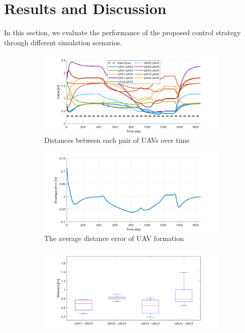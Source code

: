 \section{Results and Discussion} \label{sec:0result}
In this section, we evaluate the performance of the proposed control strategy through different simulation scenarios.

\begin{figure}[t]
    \centering
    \begin{subfigure}[b]{0.49\textwidth}
    \includegraphics[width=\textwidth]{paper1/images/distance.png}
    \caption{Distances between each pair of UAVs over time}
    \label{fig:chap2_distance}
    \end{subfigure}
    \begin{subfigure}[b]{0.49\textwidth}
    \includegraphics[width=\textwidth]{paper1/images/error.png}
    \caption{The average distance error of UAV formation}
    \label{fig:chap2_error}
    \end{subfigure}
    \begin{subfigure}[b]{0.49\textwidth}
    \includegraphics[width=\textwidth]{paper1/images/mean.png}

\end{subfigure}
\end{figure}
